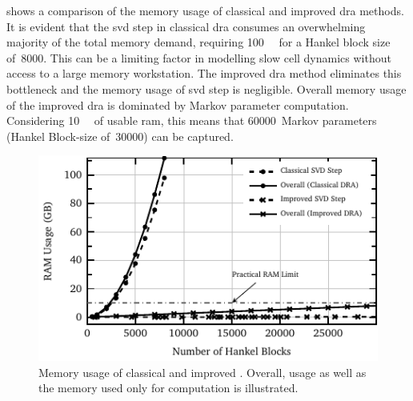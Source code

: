   shows a  comparison  of  the memory  usage  of classical  and
improved \gls{dra} methods.  It is evident that the \gls{svd}  step in classical
\gls{dra}  consumes  an  overwhelming  majority  of  the  total  memory  demand,
requiring \approx \SI{100}{\giga\byte} for a Hankel block size of~8000. This can
be a limiting factor  in modelling slow cell dynamics without  access to a large
memory workstation. The improved \gls{dra} method eliminates this bottleneck and
the memory  usage of \gls{svd} step  is negligible. Overall memory  usage of the
improved  \gls{dra} is  dominated by  Markov parameter  computation. Considering
\SI{10}{\giga\byte} of usable \gls{ram}, this means that 60000~Markov parameters
(Hankel Block-size of~30000) can be captured.

\begin{figure}[!htbp]
    \centering
    \includegraphics{ram_usage.pdf}
    \caption[%
    Memory usage of classical and improved 
    ]%
    {%
        Memory  usage  of  classical and  improved  .  Overall,
          usage   as  well   as  the   memory  used   only  for
         computation is illustrated.
    }%
    \label{fig:memory}
\end{figure}

